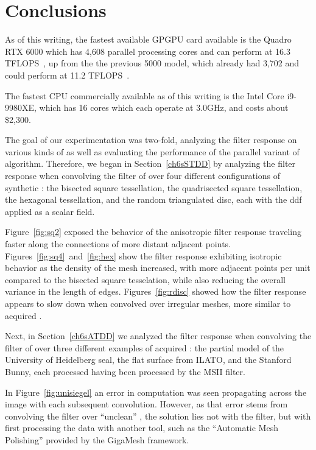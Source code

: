 \chapter{Conclusions}
As of this writing, the fastest available GPGPU card available is the Quadro RTX 6000 which has 4,608 parallel processing cores and can perform at 16.3 TFLOPS~\cite{quadro6k}, up from the the previous 5000 model, which already had 3,702 and could perform at 11.2 TFLOPS~\cite{quadro5k}.

The fastest CPU commercially available as of this writing is the Intel Core i9-9980XE, which has 16 cores which each operate at 3.0GHz, and costs about \$2,300.



The goal of our experimentation was two-fold, analyzing the filter response on various kinds of \tdd{} as well as evaluating the performance of the parallel variant of  algorithm. Therefore, we began in Section~\ref{ch6sSTDD} by analyzing the filter response when convolving the filter of over four different configurations of synthetic \tdd{}: the bisected square tessellation, the quadrisected square tessellation, the hexagonal tessellation, and the random triangulated disc, each with the \gls{ddf} applied as a scalar field. 

Figure~\ref{fig:sq2} exposed the behavior of the anisotropic filter response traveling faster along the connections of more distant adjacent points. Figures~\ref{fig:sq4}~and~\ref{fig:hex} show the filter response exhibiting isotropic behavior as the density of the mesh increased, with more adjacent points per unit compared to the bisected square tesselation, while also reducing the overall variance in the length of edges. Figures~\ref{fig:rdisc} showed how the filter response appears to slow down when convolved over irregular meshes, more similar to acquired \tdd{}.

Next, in Section~\ref{ch6sATDD} we analyzed the filter response when convolving the filter of over three different examples of acquired \tdd{}: the partial model of the University of Heidelberg seal, the flat surface from ILATO, and the Stanford Bunny, each processed having been processed by the \gls{MSII} filter.

In Figure~\ref{fig:unisiegel} an error in computation was seen propagating across the image with each subsequent convolution. However, as that error stems from convolving the filter over ``unclean'' \tdd{}, the solution lies not with the filter, but with first processing the data with another tool, such as the ``Automatic Mesh Polishing'' provided by the GigaMesh framework.

